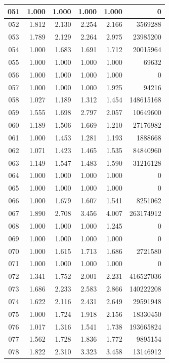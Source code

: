 \begin{longtable}{|c|r|r|r|r|r|}
\hline
051 & 1.000 & 1.000 & 1.000 & 1.000 & 0 \\
\hline
052 & 1.812 & 2.130 & 2.254 & 2.166 & 3569288 \\
\hline
053 & 1.789 & 2.129 & 2.264 & 2.975 & 23985200 \\
\hline
054 & 1.000 & 1.683 & 1.691 & 1.712 & 20015964 \\
\hline
055 & 1.000 & 1.000 & 1.000 & 1.000 & 69632 \\
\hline
056 & 1.000 & 1.000 & 1.000 & 1.000 & 0 \\
\hline
057 & 1.000 & 1.000 & 1.000 & 1.925 & 94216 \\
\hline
058 & 1.027 & 1.189 & 1.312 & 1.454 & 148615168 \\
\hline
059 & 1.555 & 1.698 & 2.797 & 2.057 & 10649600 \\
\hline
060 & 1.189 & 1.506 & 1.669 & 1.210 & 27176982 \\
\hline
061 & 1.000 & 1.453 & 1.281 & 1.193 & 1888668 \\
\hline
062 & 1.071 & 1.423 & 1.465 & 1.535 & 84840960 \\
\hline
063 & 1.149 & 1.547 & 1.483 & 1.590 & 31216128 \\
\hline
064 & 1.000 & 1.000 & 1.000 & 1.000 & 0 \\
\hline
065 & 1.000 & 1.000 & 1.000 & 1.000 & 0 \\
\hline
066 & 1.000 & 1.679 & 1.607 & 1.541 & 8251062 \\
\hline
067 & 1.890 & 2.708 & 3.456 & 4.007 & 263174912 \\
\hline
068 & 1.000 & 1.000 & 1.000 & 1.245 & 0 \\
\hline
069 & 1.000 & 1.000 & 1.000 & 1.000 & 0 \\
\hline
070 & 1.000 & 1.615 & 1.713 & 1.686 & 2721580 \\
\hline
071 & 1.000 & 1.000 & 1.000 & 1.000 & 0 \\
\hline
072 & 1.341 & 1.752 & 2.001 & 2.231 & 416527036 \\
\hline
073 & 1.686 & 2.233 & 2.583 & 2.866 & 140222208 \\
\hline
074 & 1.622 & 2.116 & 2.431 & 2.649 & 29591948 \\
\hline
075 & 1.000 & 1.724 & 1.918 & 2.156 & 18330450 \\
\hline
076 & 1.017 & 1.316 & 1.541 & 1.738 & 193665824 \\
\hline
077 & 1.562 & 1.728 & 1.836 & 1.772 & 9895154 \\
\hline
078 & 1.822 & 2.310 & 3.323 & 3.458 & 13146912 \\

\end{longtable}
